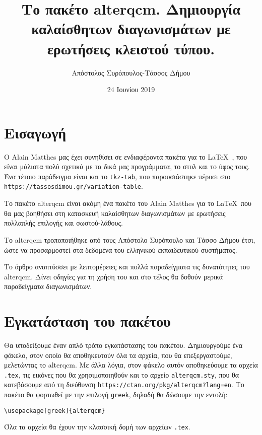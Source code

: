 \documentclass[11pt]{article}
\begin{document}
	\title{Το πακέτο alterqcm. Δημιουργία καλαίσθητων διαγωνισμάτων με ερωτήσεις κλειστού τύπου.}
	\author{Απόστολος Συρόπουλος-Τάσσος Δήμου}
	\date{24 Ιουνίου 2019}
	\maketitle
\section{Εισαγωγή} 
Ο Alain Matthes μας έχει συνηθίσει σε ενδιαφέροντα πακέτα για το \LaTeX\ , που είναι μάλιστα πολύ σχετικά με τα δικά μας προγράμματα, το στυλ και το ύφος τους. Ένα τέτοιο παράδειγμα είναι και το \texttt{tkz-tab}, που παρουσιάστηκε πέρυσι στο \texttt{https://tassosdimou.gr/variation-table}.

Το πακέτο \textsf{alterqcm} είναι ακόμη ένα πακέτο του Alain Matthes για το \LaTeX\, που θα μας βοηθήσει στη κατασκευή καλαίσθητων διαγωνισμάτων με ερωτήσεις πολλαπλής επιλογής και σωστού-λάθους.

Το \textsf{alterqcm}  τροποποιήθηκε από τους Απόστολο Συρόπουλο και Τάσσο Δήμου έτσι, ώστε να προσαρμοστεί στα δεδομένα του ελληνικού εκπαιδευτικού συστήματος. 

 Το άρθρο αναπτύσσει με λεπτομέρειες και πολλά παραδείγματα τις δυνατότητες του \textsf{alterqcm}. Δίνει οδηγίες για τη χρήση του και στο τέλος  θα δοθούν μερικά παραδείγματα διαγωνισμάτων.

\section{Εγκατάσταση του πακέτου}	
Θα υποδείξουμε έναν απλό τρόπο εγκατάστασης του πακέτου. Δημιουργούμε ένα φάκελο, στον οποίο θα αποθηκευτούν όλα τα αρχεία, που θα επεξεργαστούμε, μελετώντας το \textsf{alterqcm}. Με άλλα λόγια, στον φάκελο αυτόν αποθηκεύουμε τα αρχεία \texttt{.tex}, τις εικόνες που θα χρησιμοποιηθούν και το αρχείο \texttt{alterqcm.sty}, που θα κατεβάσουμε από τη διεύθυνση \texttt{https://ctan.org/pkg/alterqcm?lang=en}. Το πακέτο θα φορτωθεί με την επιλογή \texttt{greek}, δηλαδή θα δώσουμε την εντολή:
\begin{verbatim}
\usepackage[greek]{alterqcm}
\end{verbatim}
Όλα τα αρχεία θα έχουν την κλασσική δομή των αρχείων \texttt{.tex}.
\end{document}
